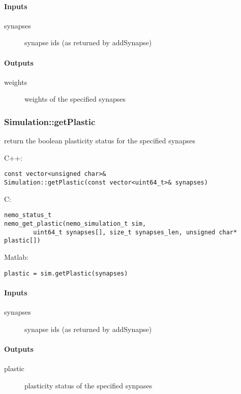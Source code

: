 \paragraph{Inputs}
\begin{description}
\item[synapses] synapse ids (as returned by addSynapse)
\end{description}
\paragraph{Outputs}
\begin{description}
\item[weights] weights of the specified synapses
\end{description}

\clearpage
\subsubsection*{Simulation::getPlastic}
\label{fn: getPlastic}
return the boolean plasticity status for the specified synapses


\noindent C++:
\begin{lstlisting}[aboveskip=2pt]
const vector<unsigned char>&
Simulation::getPlastic(const vector<uint64_t>& synapses)
\end{lstlisting}

\noindent C:
\begin{lstlisting}[aboveskip=2pt]
nemo_status_t
nemo_get_plastic(nemo_simulation_t sim, 
        uint64_t synapses[], size_t synapses_len, unsigned char* plastic[])
\end{lstlisting}

\noindent Matlab:
\begin{lstlisting}[aboveskip=2pt]
plastic = sim.getPlastic(synapses)
\end{lstlisting}
\paragraph{Inputs}
\begin{description}
\item[synapses] synapse ids (as returned by addSynapse)
\end{description}
\paragraph{Outputs}
\begin{description}
\item[plastic] plasticity status of the specified synpases
\end{description}

